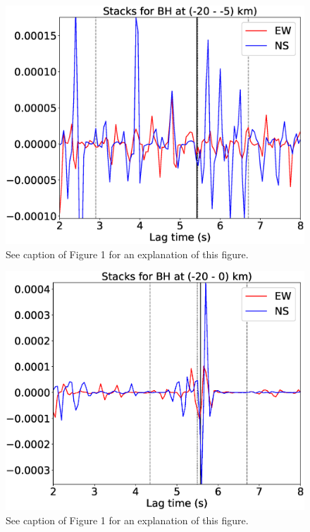 \documentclass[letterpaper, 12pt]{article}
\begin{document}
\begin{figure}[H]
\includegraphics[width=\linewidth]{figures/intervals/BH_-20_-05_stacks.eps}
\caption{See caption of Figure 1 for an explanation of this figure.}
\end{figure}

\begin{figure}[H]
\includegraphics[width=\linewidth]{figures/intervals/BH_-20_000_stacks.eps}
\caption{See caption of Figure 1 for an explanation of this figure.}
\end{figure}
\end{document}
